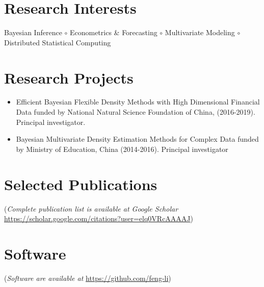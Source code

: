 \documentclass[twoside,a4paper,11pt]{amsart}
\begin{document}
\section*{Research Interests}

Bayesian Inference $\circ$ Econometrics \& Forecasting $\circ$ Multivariate
Modeling $\circ$ Distributed Statistical Computing


\section*{Research Projects}
\begin{itemize}
\item Efficient Bayesian Flexible Density Methods with High Dimensional Financial Data
  funded by National Natural Science Foundation of China, (2016-2019). Principal investigator.

\item Bayesian Multivariate Density Estimation Methods for Complex Data funded by Ministry
  of Education, China (2014-2016). Principal investigator

\end{itemize}

\section*{Selected Publications}
{\footnotesize (\emph{Complete publication list is available at Google Scholar}
  \url{https://scholar.google.com/citations?user=elq0VRcAAAAJ})}
\nocite{zhu2021least}
\nocite{wang2021uncertainty_jors}
\nocite{kang2021deja_jbr}
\nocite{hao2020bilinear}
\nocite{li2020forecasting}
\nocite{kang2020gratis_sam}
\nocite{li2020fppcn}
\nocite{kalesan2020intersections}
\nocite{bailey2019changes}
\nocite{li2019credit}
\nocite{li2018improving_ijf}
\nocite{pino2018cohort}
\nocite{li2016distributedcn}
\nocite{li2013bayesian}
\nocite{li2013efficient_sjs}
\nocite{li2011modeling}
\nocite{li2010flexible_jspi}

\printbibliography[heading=none,  nottype=software]

\section*{Software}
{\footnotesize (\emph{Software are available at} \url{https://github.com/feng-li})}
\nocite{gratis}
\nocite{spark-dlsa}
\printbibliography[heading=none, type=software]

% 
% 
\end{document}
